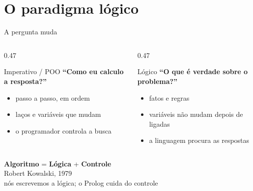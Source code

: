 \documentclass[aspectratio=169,11pt,xcolor=table]{beamer}
\begin{document}
\section{O paradigma lógico}

\begin{frame}{A pergunta muda}
  \begin{columns}[T]
    \begin{column}{0.47\textwidth}
      \begin{block}{Imperativo / POO}
        \small\textbf{``Como eu calculo a resposta?''}
        \begin{itemize}
          \item passo a passo, em ordem
          \item laços e variáveis que mudam
          \item o programador controla a busca
        \end{itemize}
      \end{block}
    \end{column}
    \begin{column}{0.47\textwidth}
      \begin{alertblock}{Lógico}
        \small\textbf{``O que é verdade sobre o problema?''}
        \begin{itemize}
          \item fatos e regras
          \item variáveis não mudam depois de ligadas
          \item a linguagem procura as respostas
        \end{itemize}
      \end{alertblock}
    \end{column}
  \end{columns}
  \vspace{16pt}
  \begin{center}
    {\Large \textbf{Algoritmo} = \alert{\textbf{Lógica}} + \textbf{Controle}}\\[3pt]
    {\small\color{muted} Robert Kowalski, 1979}\\[8pt]
    {\small nós escrevemos a lógica; o Prolog cuida do controle}
  \end{center}
\end{frame}
\end{document}
